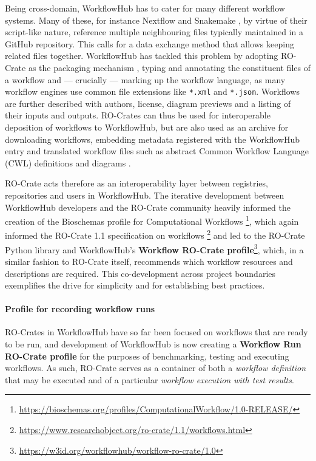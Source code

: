 Being cross-domain, WorkflowHub has to cater for many different workflow
systems. Many of these, for instance Nextflow
\cite{Di Tommaso 2017} and Snakemake
\cite{Koster 2012}, by
virtue of their script-like nature, reference multiple neighbouring
files typically maintained in a GitHub repository. This calls for a data
exchange method that allows keeping related files together. WorkflowHub
has tackled this problem by adopting RO-Crate as the packaging mechanism
\cite{Bietrix 2021}, typing and
annotating the constituent files of a workflow and --- crucially ---
marking up the workflow language, as many workflow engines use common
file extensions like \texttt{*.xml} and \texttt{*.json}. Workflows are
further described with authors, license, diagram previews and a listing
of their inputs and outputs. RO-Crates can thus be used for
interoperable deposition of workflows to WorkflowHub, but are also used
as an archive for downloading workflows, embedding metadata registered
with the WorkflowHub entry and translated workflow files such as
abstract Common Workflow Language (CWL)
\cite{Crusoe 2022} definitions and
diagrams \cite{Goble 2021}.

RO-Crate acts therefore as an interoperability layer between registries,
repositories and users in WorkflowHub. The iterative development between
WorkflowHub developers and the RO-Crate community heavily informed the
creation of the Bioschemas
\cite{Gray 2017} profile for Computational
Workflows \footnote{\url{https://bioschemas.org/profiles/ComputationalWorkflow/1.0-RELEASE/}}, which again informed the
RO-Crate
1.1 specification on workflows \footnote{\url{https://www.researchobject.org/ro-crate/1.1/workflows.html}} and led to the RO-Crate Python library
\cite{ro-crate-py} and
WorkflowHub's
\textbf{Workflow
RO-Crate profile}\footnote{\url{https://w3id.org/workflowhub/workflow-ro-crate/1.0}}, which, in a similar fashion to RO-Crate itself,
recommends which workflow resources and descriptions are required. This
co-development across project boundaries exemplifies the drive for
simplicity and for establishing best practices.

\paragraph{Profile for recording workflow runs}
\label{ch5:profile-for-recording-workflow-runs}

RO-Crates in WorkflowHub have so far been focused on workflows that are
ready to be run, and development of WorkflowHub is now creating a
\textbf{Workflow Run RO-Crate profile} for the purposes of benchmarking,
testing and executing workflows. As such, RO-Crate serves as a container
of both a \emph{workflow definition} that may be executed and of a
particular \emph{workflow execution with test results}.

